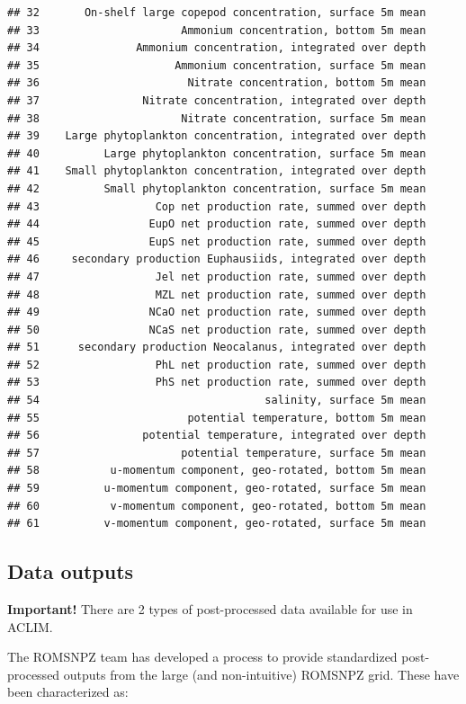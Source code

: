 \documentclass[
]{article}
\begin{document}
\begin{verbatim}
## 32       On-shelf large copepod concentration, surface 5m mean
## 33                      Ammonium concentration, bottom 5m mean
## 34               Ammonium concentration, integrated over depth
## 35                     Ammonium concentration, surface 5m mean
## 36                       Nitrate concentration, bottom 5m mean
## 37                Nitrate concentration, integrated over depth
## 38                      Nitrate concentration, surface 5m mean
## 39    Large phytoplankton concentration, integrated over depth
## 40          Large phytoplankton concentration, surface 5m mean
## 41    Small phytoplankton concentration, integrated over depth
## 42          Small phytoplankton concentration, surface 5m mean
## 43                  Cop net production rate, summed over depth
## 44                 EupO net production rate, summed over depth
## 45                 EupS net production rate, summed over depth
## 46     secondary production Euphausiids, integrated over depth
## 47                  Jel net production rate, summed over depth
## 48                  MZL net production rate, summed over depth
## 49                 NCaO net production rate, summed over depth
## 50                 NCaS net production rate, summed over depth
## 51      secondary production Neocalanus, integrated over depth
## 52                  PhL net production rate, summed over depth
## 53                  PhS net production rate, summed over depth
## 54                                   salinity, surface 5m mean
## 55                       potential temperature, bottom 5m mean
## 56                potential temperature, integrated over depth
## 57                      potential temperature, surface 5m mean
## 58           u-momentum component, geo-rotated, bottom 5m mean
## 59          u-momentum component, geo-rotated, surface 5m mean
## 60           v-momentum component, geo-rotated, bottom 5m mean
## 61          v-momentum component, geo-rotated, surface 5m mean
\end{verbatim}

\hypertarget{data-outputs}{%
\subsection{Data outputs}\label{data-outputs}}

\textbf{Important!} There are 2 types of post-processed data available
for use in ACLIM.

The ROMSNPZ team has developed a process to provide standardized
post-processed outputs from the large (and non-intuitive) ROMSNPZ grid.
These have been characterized as:
\end{document}
